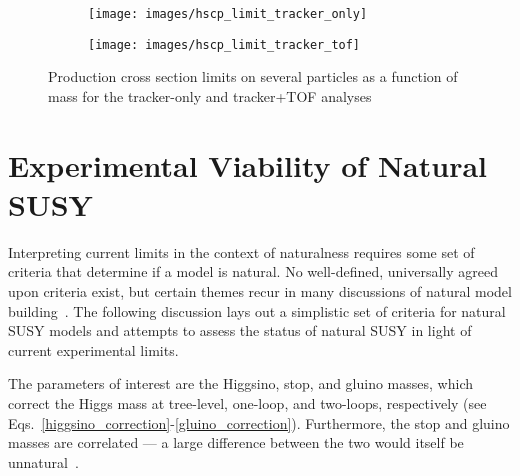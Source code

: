 \documentclass[12pt]{article}
\begin{document}
        \noindent \begin{figure}[htbp] \begin{center}
        \begin{subfigure}[htbp]{0.4\textwidth} \begin{center}
        \texttt{[image: images/hscp\_limit\_tracker\_only]}
        \end{center} \end{subfigure}
        \begin{subfigure}[htbp]{0.4\textwidth} \begin{center}
        \texttt{[image: images/hscp\_limit\_tracker\_tof]}
        \end{center} \end{subfigure}
        \caption{Production cross section limits on several particles as a function of mass for the tracker-only and tracker+TOF analyses~\cite{cms_hscp}}
        \label{hscp_limits}
        \end{center} \end{figure}

\section{Experimental Viability of Natural SUSY}
    Interpreting current limits in the context of naturalness requires some set of criteria that determine if a model is natural. No well-defined, universally agreed upon criteria exist, but certain themes recur in many discussions of natural model building~\cite{craig, vestiges, evans_toward_full, feng, cornering, kim}. The following discussion lays out a simplistic set of criteria for natural SUSY models and attempts to assess the status of natural SUSY in light of current experimental limits.
    
    The parameters of interest are the Higgsino, stop, and gluino masses, which correct the Higgs mass at tree-level, one-loop, and two-loops, respectively (see Eqs.~\ref{higgsino_correction}-\ref{gluino_correction}). Furthermore, the stop and gluino masses are correlated --- a large difference between the two would itself be unnatural~\cite{cornering}.
\end{document}
